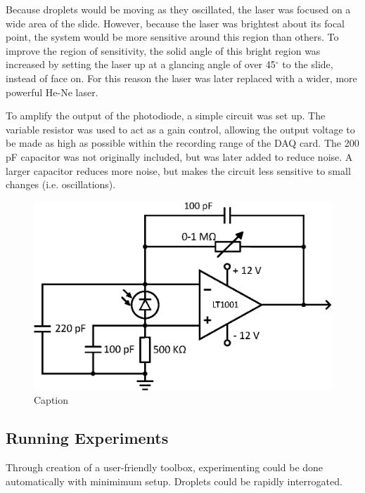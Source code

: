 \documentclass{physics_article_B}
\begin{document}
        Because droplets would be moving as they oscillated, the laser was focused on a wide area of the slide. However, because the laser was brightest about its focal point, the system would be more sensitive around this region than others. To improve the region of sensitivity, the solid angle of this bright region was increased by setting the laser up at a glancing angle of over 45$^{\circ}$ to the slide, instead of face on. For this reason the laser was later replaced with a wider, more powerful He-Ne laser.
        
        To amplify the output of the photodiode, a simple circuit was set up\cite{artofelectronics}. The variable resistor was used to act as a gain control, allowing the output voltage to be made as high as possible within the recording range of the DAQ card. The 200 pF capacitor was not originally included, but was later added to reduce noise. A larger capacitor reduces more noise, but makes the circuit less sensitive to small changes (i.e. oscillations).
    
        \begin{figure}[H]
            \centering
            \includegraphics[scale=0.8]{Figures/PDCircuit.eps}
            \caption{Caption}
            \label{fig:my_label}
        \end{figure}
    
    
    
    \subsection{Running Experiments\label{sect:method:exp}}
        Through creation of a user-friendly toolbox, experimenting could be done automatically with minimimum setup. Droplets could be rapidly interrogated.
\end{document}
